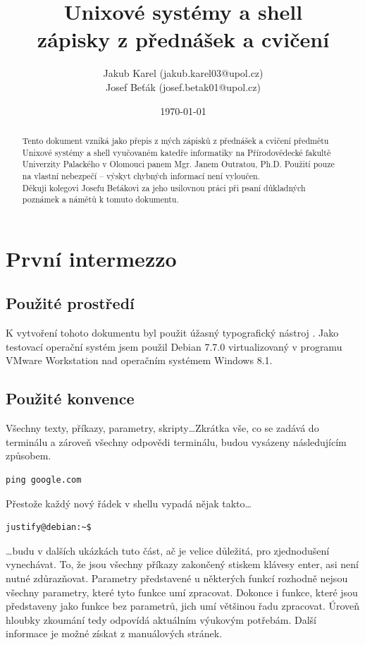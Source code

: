 \documentclass{article}
\title{\Huge{Unixové systémy a shell}\\ \vspace{1em} \normalsize{zápisky z přednášek a cvičení}}
\author{
	\normalsize Jakub Karel (jakub.karel03@upol.cz) \\
	\normalsize Josef Beťák (josef.betak01@upol.cz)}
\date{\today}
\begin{document}
\maketitle

\begin{abstract}
Tento dokument vzniká jako přepis z mých zápisků z přednášek a cvičení předmětu Unixové systémy a shell vyučovaném katedře informatiky na Přírodovědecké fakultě Univerzity Palackého v Olomouci panem Mgr. Janem Outratou, Ph.D. Použití pouze na vlastní nebezpečí -- výskyt chybných informací není vyloučen.\\
Děkuji kolegovi Josefu Beťákovi za jeho usilovnou práci při psaní důkladných poznámek a námětů k tomuto dokumentu.
\end{abstract}

\thispagestyle{empty}
\newpage
\thispagestyle{empty}
\tableofcontents
\thispagestyle{empty}
\newpage

\setcounter{page}{1}
\section{První intermezzo}
\subsection{Použité prostředí}
K vytvoření tohoto dokumentu byl použit úžasný typografický nástroj \LaTeXe. Jako testovací operační systém jsem použil Debian 7.7.0 virtualizovaný v programu VMware Workstation nad operačním systémem Windows 8.1.

\subsection{Použité konvence}
Všechny texty, příkazy, parametry, skripty\dots Zkrátka vše, co se zadává do terminálu a zároveň všechny odpovědi terminálu, budou vysázeny následujícím způsobem. 
\begin{verbatim}
ping google.com
\end{verbatim}
Přestože každý nový řádek v shellu vypadá nějak takto\dots
\begin{verbatim}
justify@debian:~$ 
\end{verbatim}
\dots budu v dalších ukázkách tuto část, ač je velice důležitá, pro zjednodušení vynechávat. To, že jsou všechny příkazy zakončený stiskem klávesy enter, asi není nutné zdůrazňovat. Parametry představené u některých funkcí rozhodně nejsou všechny parametry, které tyto funkce umí zpracovat. Dokonce i funkce, které jsou představeny jako funkce bez parametrů, jich umí většinou řadu zpracovat. Úroveň hloubky zkoumání tedy odpovídá aktuálním výukovým potřebám. Další informace je možné získat z manuálových stránek.
\end{document}
